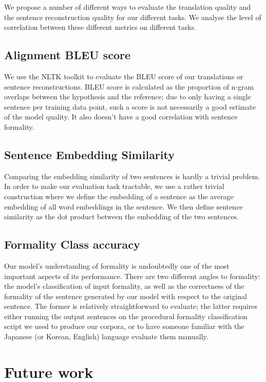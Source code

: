 \documentclass[11pt]{article}
\begin{document}
We propose a number of different ways to evaluate the translation quality and the sentence reconstruction quality for our different tasks. We analyse the level of correlation between these different metrics on different tasks.

\subsection{Alignment BLEU score}

We use the NLTK toolkit \cite{NLTK} to evaluate the BLEU score of our translations or sentence reconstructions. BLEU score is calculated as the proportion of n-gram overlaps between the hypothesis and the reference; due to only having a single sentence per training data point, such a score is not necessarily a good estimate of the model quality. It also doesn't have a good correlation with sentence formality.

\subsection{Sentence Embedding Similarity}

Comparing the embedding similarity of two sentences is hardly a trivial problem. In order to make our evaluation task tractable, we use a rather trivial construction where we define the embedding of a sentence as the average embedding of all word embeddings in the sentence. We then define sentence similarity as the dot product between the embedding of the two sentences. 

\subsection{Formality Class accuracy}

Our model's understanding of formality is undoubtedly one of the most important aspects of its performance. There are two different angles to formality: the model's classification of input formality, as well as the correctness of the formality of the sentence generated by our model with respect to the original sentence. The former is relatively straightforward to evaluate; the latter requires either running the output sentences on the procedural formality classification script we used to produce our corpora, or to have someone familiar with the Japanese (or Korean, English) language evaluate them manually.

\section{Future work}
\end{document}
